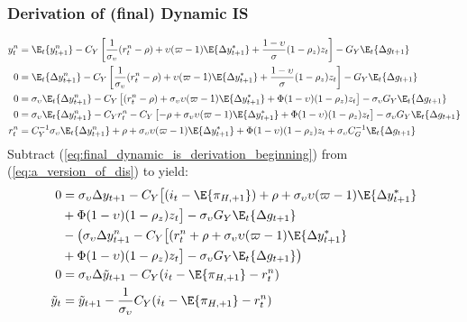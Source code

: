 \subsubsection*{Derivation of (final) Dynamic IS}
\begin{align}\label{eq:final_dynamic_is_derivation_beginning}
    y^n_t  &= \E_t \{y^n_{t+1}\} - C_Y\left[\frac{1}{\sigma_\upsilon}(r^n_t - \rho) + \upsilon (\varpi - 1)\E \{\Delta y_{t+1}^* \}  + \frac{1-\upsilon}{\sigma} (1-\rho_z)z_t\right] - G_Y \E_t \{ \Delta g_{t+1} \}\\
    0  &= \E_t \{\Delta y^n_{t+1}\} - C_Y\left[\frac{1}{\sigma_\upsilon}(r^n_t - \rho) + \upsilon (\varpi - 1)\E \{\Delta y_{t+1}^* \}  + \frac{1-\upsilon}{\sigma} (1-\rho_z)z_t\right] - G_Y \E_t \{ \Delta g_{t+1} \}\\
    0  &= \sigma_\upsilon \E_t \{\Delta y^n_{t+1}\} - C_Y\left[(r^n_t - \rho) + \sigma_\upsilon \upsilon (\varpi - 1)\E \{\Delta y_{t+1}^* \}  + \Phi (1-\upsilon)(1-\rho_z)z_t\right] - \sigma_\upsilon G_Y \E_t \{ \Delta g_{t+1} \}\\
    0  &= \sigma_\upsilon \E_t \{\Delta y^n_{t+1}\} - C_Y r^n_t - C_Y\left[-\rho + \sigma_\upsilon \upsilon (\varpi - 1)\E \{\Delta y_{t+1}^* \}  + \Phi (1-\upsilon)(1-\rho_z)z_t\right] - \sigma_\upsilon G_Y \E_t \{ \Delta g_{t+1} \}\\
    r^n_t  &= C_Y^{-1}\sigma_\upsilon \E_t \{\Delta y^n_{t+1}\} + \rho + \sigma_\upsilon \upsilon (\varpi - 1)\E \{\Delta y_{t+1}^* \}  + \Phi (1-\upsilon)(1-\rho_z)z_t + \sigma_\upsilon C_G^{-1}\E_t \{ \Delta g_{t+1} \} \label{eq:appendix_natural_rate_of_interest_dynamic_is}
\end{align}
Subtract (\ref{eq:final_dynamic_is_derivation_beginning}) from (\ref{eq:a_version_of_dis}) to yield:
\begin{align}
    0 &= \sigma_\upsilon \Delta y_{t+1} - C_Y\big[(i_t - \E \{ \pi_{H,+1}\}) + \rho + \sigma_\upsilon \upsilon (\varpi - 1)\E \{\Delta y_{t+1}^* \} \nonumber \\ 
    &+ \Phi(1-\upsilon) (1-\rho_z)z_t \big] - \sigma_\upsilon G_Y \E_t \{ \Delta g_{t+1} \} \nonumber \\
    &- \big(\sigma_\upsilon \Delta y^n_{t+1} - C_Y\big[(r^n_t + \rho + \sigma_\upsilon \upsilon (\varpi - 1)\E \{\Delta y_{t+1}^* \} \nonumber \\ 
    &+ \Phi(1-\upsilon) (1-\rho_z)z_t \big] - \sigma_\upsilon G_Y \E_t \{ \Delta g_{t+1} \} \big) \\
    0 &= \sigma_\upsilon \Delta \tilde{y}_{t+1} - C_Y(i_t - \E \{ \pi_{H,+1}\} - r^n_t)\\
    \tilde{y}_t &= \tilde{y}_{t+1} - \frac{1}{\sigma_\upsilon}C_Y(i_t - \E \{ \pi_{H,+1}\} - r^n_t) \label{eq:final_dynamic_is_derivation_end}
\end{align}